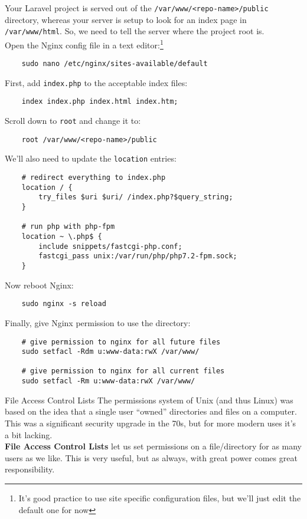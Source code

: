 Your Laravel project is served out of the \texttt{/var/www/<repo-name>/public} directory, whereas your server is setup to look for an index page in \texttt{/var/www/html}. So, we need to tell the server where the project root is.
\\

Open the Nginx config file in a text editor:\footnote{It's good practice to use site specific configuration files, but we'll just edit the default one for now}

\begin{verbatim}
    sudo nano /etc/nginx/sites-available/default
\end{verbatim}

First, add \texttt{index.php} to the acceptable index files:

\begin{verbatim}
    index index.php index.html index.htm;
\end{verbatim}

Scroll down to \texttt{root} and change it to:

\begin{verbatim}
    root /var/www/<repo-name>/public
\end{verbatim}

We'll also need to update the \texttt{location} entries:

\begin{verbatim}
    # redirect everything to index.php
    location / {
        try_files $uri $uri/ /index.php?$query_string;
    }

    # run php with php-fpm
    location ~ \.php$ {
        include snippets/fastcgi-php.conf;
        fastcgi_pass unix:/var/run/php/php7.2-fpm.sock;
    }
\end{verbatim}

Now reboot Nginx:

\begin{verbatim}
    sudo nginx -s reload
\end{verbatim}

Finally, give Nginx permission to use the directory:

\begin{verbatim}
    # give permission to nginx for all future files
    sudo setfacl -Rdm u:www-data:rwX /var/www/

    # give permission to nginx for all current files
    sudo setfacl -Rm u:www-data:rwX /var/www/
\end{verbatim}

\begin{infobox}{File Access Control Lists}
    The permissions system of Unix (and thus Linux) was based on the idea that a single user ``owned'' directories and files on a computer. This was a significant security upgrade in the 70s, but for more modern uses it's a bit lacking.
    \\

    \textbf{File Access Control Lists} let us set permissions on a file/directory for as many users as we like. This is very useful, but as always, with great power comes great responsibility.
\end{infobox}

